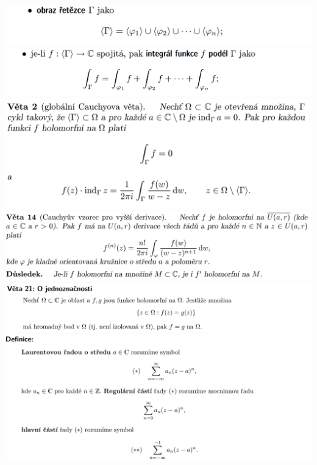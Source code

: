 \documentclass[12pt,a4paper]{article}
\begin{document}
\begin{center}
		\includegraphics[width=\textwidth]{img/5komp/2020-06-21 10 08 48.png}\vspace{0.3cm}
		\includegraphics[width=\textwidth]{img/5komp/2020-06-21 10 08 56.png}\vspace{0.3cm}
		\includegraphics[width=\textwidth]{img/5komp/2020-06-21 10 09 31.png}\vspace{0.3cm}
		\includegraphics[width=\textwidth]{img/5komp/2020-06-21 10 34 53.png}\vspace{0.3cm}
		\includegraphics[width=\textwidth]{img/5komp/2020-06-21 10 01 16.png}\vspace{0.3cm}
		\includegraphics[width=\textwidth]{img/5komp/2020-06-21 10 02 36.png}\vspace{0.3cm}

\end{center}
\end{document}
